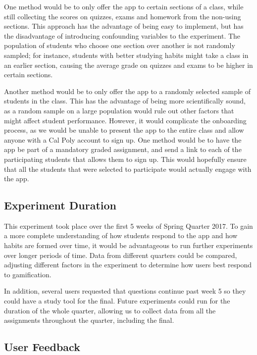 \par One method would be to only offer the app to certain sections of a class, while still collecting the scores on quizzes, exams and homework from the non-using sections. This approach has the advantage of being easy to implement, but has the disadvantage of introducing confounding variables to the experiment. The population of students who choose one section over another is not randomly sampled; for instance, students with better studying habits might take a class in an earlier section, causing the average grade on quizzes and exams to be higher in certain sections.

\par Another method would be to only offer the app to a randomly selected sample of students in the class. This has the advantage of being more scientifically sound, as a random sample on a large population would rule out other factors that might affect student performance. However, it would complicate the onboarding process, as we would be unable to present the app to the entire class and allow anyone with a Cal Poly account to sign up. One method would be to have the app be part of a mandatory graded assignment, and send a link to each of the participating students that allows them to sign up. This would hopefully ensure that all the students that were selected to participate would actually engage with the app.

\subsection{Experiment Duration}

\par This experiment took place over the first 5 weeks of Spring Quarter 2017. To gain a more complete understanding of how students respond to the app and how habits are formed over time, it would be advantageous to run further experiments over longer periods of time. Data from different quarters could be compared, adjusting different factors in the experiment to determine how users best respond to gamification. 

\par In addition, several users requested that questions continue past week 5 so they could have a study tool for the final. Future experiments could run for the duration of the whole quarter, allowing us to collect data from all the assignments throughout the quarter, including the final.

\subsection{User Feedback}


